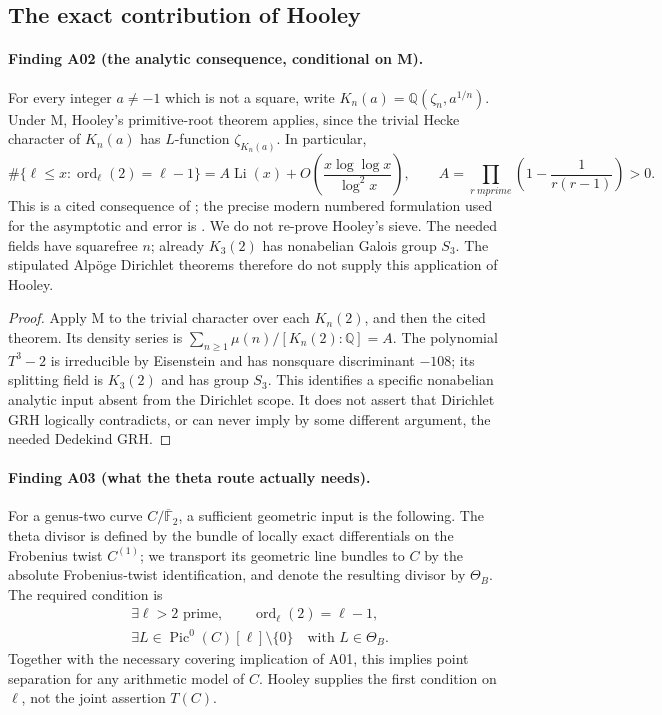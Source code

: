 \documentclass[11pt,a4paper]{article}
\begin{document}
\subsection{The exact contribution of Hooley}

\paragraph{Finding A02 (the analytic consequence, conditional on M).}
For every integer $a\ne-1$ which is not a square, write
$K_n(a)=\mathbb Q(\zeta_n,a^{1/n})$. Under M, Hooley's primitive-root
theorem applies, since the trivial Hecke character of $K_n(a)$ has
$L$-function $\zeta_{K_n(a)}$. In particular,
\[
 \#\{\ell\le x:\operatorname{ord}_{\ell}(2)=\ell-1\}
 = A\operatorname{Li}(x)
   +O\!\left(\frac{x\log\log x}{\log^2x}\right),\qquad
 A=\prod_{r\ {
m prime}}\left(1-\frac1{r(r-1)}\right)>0.
 \tag{A02}
\]
This is a cited consequence of \cite[\S7, concluding theorem]{Hooley}; the precise modern
numbered formulation used for the asymptotic and error is
\cite[Theorem~1.1, specialized to $a=2$]{FanPollack}. We do not re-prove
Hooley's sieve. The needed fields have squarefree $n$; already $K_3(2)$
has nonabelian Galois group $S_3$. The stipulated Alp\"oge Dirichlet
theorems therefore do not supply this application of Hooley.

\begin{proof}
Apply M to the trivial character over each $K_n(2)$, and then the
cited theorem. Its density series is
$\sum_{n\ge1}\mu(n)/[K_n(2):\mathbb Q]=A$. The polynomial $T^3-2$
is irreducible by Eisenstein and has nonsquare discriminant $-108$;
its splitting field is $K_3(2)$ and has group $S_3$. This identifies
a specific nonabelian analytic input absent from the Dirichlet scope.
It does not assert that Dirichlet GRH logically contradicts, or can
never imply by some different argument, the needed Dedekind GRH.
\end{proof}

\paragraph{Finding A03 (what the theta route actually needs).}
For a genus-two curve $C/\overline{\mathbb F}_2$, a sufficient geometric
input is the following. The theta divisor is defined by the bundle of
locally exact differentials on the Frobenius twist $C^{(1)}$; we
transport its geometric line bundles to $C$ by the absolute
Frobenius-twist identification, and denote the resulting divisor by
$\Theta_B$. The required condition is
\[
 \begin{gathered}
 \exists\ell>2\text{ prime},\qquad \operatorname{ord}_{\ell}(2)=\ell-1,\\
 \exists L\in\operatorname{Pic}^0(C)[\ell]\setminus\{0\}
                  \quad\text{with }L\in\Theta_B.
 \end{gathered}
 \tag{T(C)}
\]
Together with the necessary covering implication of A01, this implies
point separation for any arithmetic model of $C$. Hooley supplies the
first condition on $\ell$, not the joint assertion $T(C)$.
\end{document}
